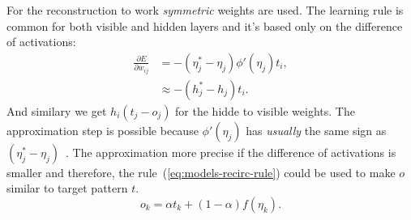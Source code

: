 For the reconstruction to work \emph{symmetric} weights are used. The learning rule is common for both visible and hidden layers and it's based only on the difference of activations: 
\begin{align}
\frac{\partial E}{\partial w_{ij}} &= -(\eta^{*}_j - \eta_j) \phi'(\eta_j) t_i, \nonumber \\
&\approx -(h^{*}_j - h_j)t_i. \nonumber 
\end{align} 
And similary we get $h_i(t_j - o_j)$ for the hidde to visible weights. The approximation step is possible because $\phi'(\eta_j)$ has \emph{usually} the same sign as $(\eta^{*}_j - \eta_j) $~\citep{hinton1988learning, o1996bio}. The approximation more precise if the difference of activations is smaller and therefore, the rule~(\ref{eq:models-recirc-rule}) could be used to make $o$ similar to target pattern $t$.
\begin{equation}
\label{eq:models-recirc-rule}
o_k = \alpha t_k + (1-\alpha)f(\eta_k). 
\end{equation} 

